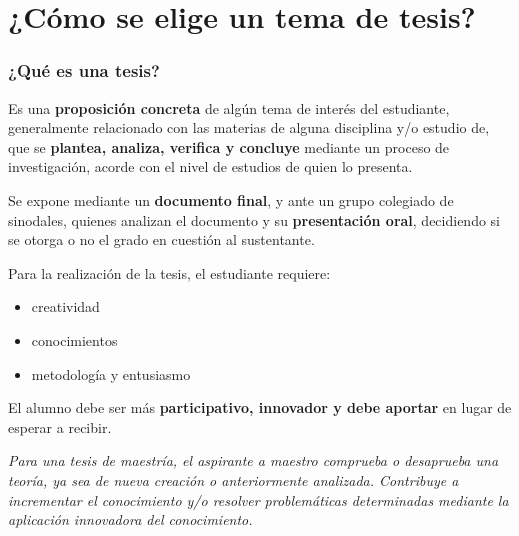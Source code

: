 \documentclass[
	11pt, %
]{beamer}
\begin{document}
\section{¿Cómo se elige un tema de tesis?}
\begin{frame}
  \frametitle{¿Qué es una tesis?}
  
  Es una \textbf{proposición concreta} de algún tema de interés del estudiante, generalmente relacionado con las materias de alguna disciplina y/o estudio de, que se \textbf{plantea, analiza, verifica y concluye} mediante un proceso de investigación, acorde con el nivel de estudios de quien lo presenta.

  \bigskip %
  
  Se expone mediante un \textbf{documento final}, y ante un grupo colegiado de sinodales, quienes analizan el documento y su \textbf{presentación oral}, decidiendo si se otorga o no el grado en cuestión al sustentante.\\
    
\end{frame}

\begin{frame}
  
  Para la realización de la tesis, el estudiante requiere:
  
  \begin{itemize}
  \item creatividad
  \item conocimientos
  \item metodología y entusiasmo
  \end{itemize}

  \bigskip %
  El alumno debe ser más \textbf{participativo, innovador y debe aportar} en lugar de esperar a recibir.\\
  \bigskip %

  \textit{Para una tesis de maestría, el aspirante a maestro comprueba o desaprueba una teoría, ya sea de nueva creación o anteriormente analizada. Contribuye a incrementar el conocimiento y/o resolver problemáticas determinadas mediante la aplicación innovadora del conocimiento.}
  
  
\end{frame}
\end{document}
